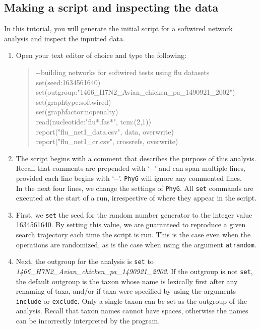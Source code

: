\documentclass[11pt]{article}
\newcommand{\phyg}{\texttt{PhyG} }
\begin{document}
\subsection{Making a script and inspecting the data}
\label{subsec:networkscript}

In this tutorial, you will generate the initial script for a softwired network analysis 
and inspect the inputted data.

\begin{enumerate}

\item Open your text editor of choice and type the following:

	\begin{quote}	
	-\/-building networks for softwired tests using flu datasets\\
	set(seed:1634561640)\\
	set(outgroup:"1466\_H7N2\_Avian\_chicken\_pa\_1490921\_2002")\\
	set(graphtype:softwired)\\
	set(graphfactor:nopenalty)\\ 
	read(nucleotide:"flu*.fas*", tcm:(2,1))\\
	report("flu\_net1\_data.csv", data, overwrite)\\
	report("flu\_net1\_cr.csv", crossrefs, overwrite)
	\end{quote}

\item The script begins with a comment that describes the purpose of this analysis. 
Recall that comments are prepended with `-{}-' and can span multiple lines, provided 
each line begins with `-{}-'. \phyg will ignore any commented lines.\\

In the next four lines, we change the settings of \texttt{PhyG}. All \texttt{set}
commands are executed at the start of a run, irrespective of where they appear 
in the script. 

\item First, we \texttt{set} the seed for the random number generator to the 
integer value 1634561640. By setting this value, we are guaranteed to reproduce 
a given search trajectory each time the script is run. This is the case even when the
operations are randomized, as is the case when using the argument \texttt{atrandom}.

\item Next, the outgroup for the analysis is \texttt{set} to 
\emph{1466\_H7N2\_Avian\_chicken\_pa\_1490921\_2002}. If the outgroup is not 
\texttt{set}, the default outgroup is the taxon whose name is lexically first after any 
renaming of taxa, and/or if taxa were specified by using the arguments \texttt{include}
or \texttt{exclude}. Only a single taxon can be set as the outgroup of the analysis. 
Recall that taxon names cannot have spaces, otherwise the names can be incorrectly 
interpreted by the program.


\end{enumerate}
\end{document}
